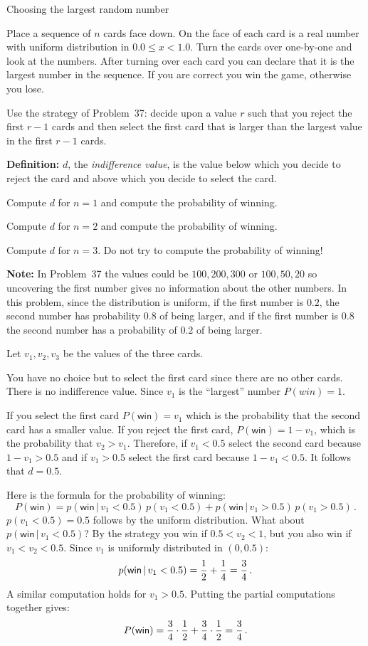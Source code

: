 \begin{prob}{Choosing the largest random number}

Place a sequence of $n$ cards face down. On the face of each card is a real number with uniform distribution in $0.0\leq x<1.0$. Turn the cards over one-by-one and look at the numbers. After turning over each card you can declare that it is the largest number in the sequence. If you are correct you win the game, otherwise you lose.

Use the strategy of Problem~37: decide upon a value $r$ such that you reject the first $r-1$ cards and then select the first card that is larger than the largest value in the first $r-1$ cards.

\textbf{Definition:} $d$, the \emph{indifference value}, is the value below which you decide to reject the card and above which you decide to select the card.

 Compute $d$ for $n=1$ and compute the probability of winning.

 Compute $d$ for $n=2$ and compute the probability of winning.

 Compute $d$ for $n=3$. Do not try to compute the probability of winning!

\textbf{Note:} In Problem~37 the values could be $100, 200, 300$ or $100, 50, 20$ so uncovering the first number gives no information about the other numbers. In this problem, since the distribution is uniform, if the first number is $0.2$, the second number has probability $0.8$ of being larger, and if the first number is $0.8$ the second number has a probability of $0.2$ of being larger.
\end{prob}

\solution{}

Let $v_1,v_2,v_3$ be the values of the three cards.

 You have no choice but to select the first card since there are no other cards. There is no indifference value. Since $v_1$ is the ``largest'' number $P({win})=1$.

 If you select the first card $P(\textsf{win})=v_1$ which is the probability that the second card has a smaller value. If you reject the first card, $P(\textsf{win})=1-v_1$, which is the probability that $v_2>v_1$. Therefore, if $v_1<0.5$ select the second card because $1-v_1>0.5$ and if $v_1>0.5$ select the first card because $1-v_1<0.5$. It follows that $d=0.5$.

Here is the formula for the probability of winning:
\[
P(\textsf{win}) = p(\textsf{win} \,|\,v_1<0.5)\,p(v_1<0.5)+ p(\textsf{win}\,|\,v_1>0.5)\,p(v_1>0.5)\,.
\]
$p(v_1<0.5)=0.5$ follows by the uniform distribution. What about $p(\textsf{win} \,|\,v_1<0.5)$? By the strategy you win if $0.5<v_2<1$, but you also win if $v_1<v_2<0.5$. Since $v_1$ is uniformly distributed in $(0,0.5)$:
\[
p(\textsf{win} \,|\,v_1<0.5)=\displaystyle\frac{1}{2} + \displaystyle\frac{1}{4}=\displaystyle\frac{3}{4}\,.
\]
A similar computation holds for $v_1>0.5$. Putting the partial computations together gives:
\[
P(\textsf{win})=\displaystyle\frac{3}{4}\cdot\displaystyle\frac{1}{2}+\displaystyle\frac{3}{4}\cdot\displaystyle\frac{1}{2}=\displaystyle\frac{3}{4}\,.
\]

